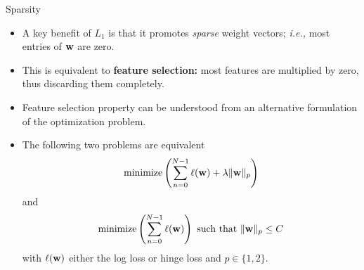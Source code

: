 \documentclass[10pt, aspectratio=169]{beamer} %
\newcommand{\w}{{\bf w}}
\begin{document}
\begin{frame}{Sparsity}
\begin{itemize}
\item A key benefit of $L_1$ is that it promotes \emph{sparse} weight vectors; \emph{i.e.,} most entries of $\w$ are zero.
\item This is equivalent to \textbf{feature selection:} most features are multiplied by zero, thus discarding them completely.
\item Feature selection property can be understood from an alternative formulation of the optimization problem.
\item The following two problems are equivalent
\[
\text{minimize} \left( \sum_{n = 0}^{N-1} \ell(\w) + \lambda \|\w\|_p \right)
\]
and
\[
\text{minimize} \left( \sum_{n = 0}^{N-1} \ell(\w) \right) \text{ such that } \|\w\|_p \le C
\]
with $\ell(\w)$ either the log loss or hinge loss and $p\in \{1,2\}$.
\end{itemize}
\end{frame}
\end{document}
